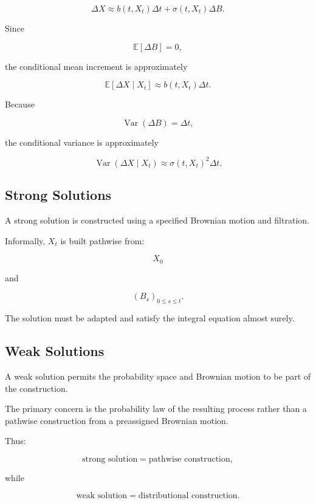 \[
\Delta X
\approx
b(t,X_t)\Delta t
+
\sigma(t,X_t)\Delta B.
\]

Since

\[
\mathbb{E}[\Delta B]=0,
\]

the conditional mean increment is approximately

\[
\boxed{
\mathbb{E}[\Delta X\mid X_t]
\approx
b(t,X_t)\Delta t.
}
\]

Because

\[
\operatorname{Var}(\Delta B)
=
\Delta t,
\]

the conditional variance is approximately

\[
\boxed{
\operatorname{Var}(\Delta X\mid X_t)
\approx
\sigma(t,X_t)^2\Delta t.
}
\]

\subsection{Strong Solutions}
\label{subsec:strong-solutions-sde}

A strong solution is constructed using a specified Brownian motion and
filtration.

Informally, \(X_t\) is built pathwise from:

\[
\boxed{
X_0
}
\]

and

\[
\boxed{
(B_s)_{0\leq s\leq t}.
}
\]

The solution must be adapted and satisfy the integral equation almost
surely.

\subsection{Weak Solutions}
\label{subsec:weak-solutions-sde}

A weak solution permits the probability space and Brownian motion to be
part of the construction.

The primary concern is the probability law of the resulting process
rather than a pathwise construction from a preassigned Brownian motion.

Thus:

\[
\boxed{
\text{strong solution}
=
\text{pathwise construction},
}
\]

while

\[
\boxed{
\text{weak solution}
=
\text{distributional construction}.
}
\]

